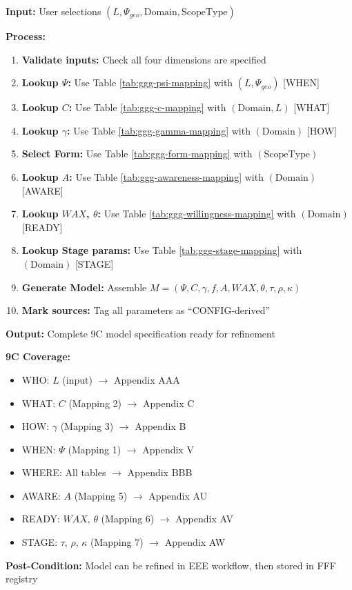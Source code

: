 \begin{tcolorbox}[colback=gray!5!white, colframe=gray!75!black,
    title=Algorithm CONFIG-1: Model Generation (9C Complete)]
\textbf{Input:} User selections $(L, \Psi_{geo}, \text{Domain}, \text{ScopeType})$

\textbf{Process:}
\begin{enumerate}
\item \textbf{Validate inputs:} Check all four dimensions are specified
\item \textbf{Lookup $\Psi$:} Use Table \ref{tab:ggg-psi-mapping} with $(L, \Psi_{geo})$ \hfill [WHEN]
\item \textbf{Lookup $C$:} Use Table \ref{tab:ggg-c-mapping} with $(\text{Domain}, L)$ \hfill [WHAT]
\item \textbf{Lookup $\gamma$:} Use Table \ref{tab:ggg-gamma-mapping} with $(\text{Domain})$ \hfill [HOW]
\item \textbf{Select Form:} Use Table \ref{tab:ggg-form-mapping} with $(\text{ScopeType})$
\item \textbf{Lookup $A$:} Use Table \ref{tab:ggg-awareness-mapping} with $(\text{Domain})$ \hfill [AWARE]
\item \textbf{Lookup $WAX$, $\theta$:} Use Table \ref{tab:ggg-willingness-mapping} with $(\text{Domain})$ \hfill [READY]
\item \textbf{Lookup Stage params:} Use Table \ref{tab:ggg-stage-mapping} with $(\text{Domain})$ \hfill [STAGE]
\item \textbf{Generate Model:} Assemble $M = (\Psi, C, \gamma, f, A, WAX, \theta, \tau, \rho, \kappa)$
\item \textbf{Mark sources:} Tag all parameters as ``CONFIG-derived''
\end{enumerate}

\textbf{Output:} Complete 9C model specification ready for refinement

\textbf{9C Coverage:}
\begin{itemize}[nosep]
\item WHO: $L$ (input) $\rightarrow$ Appendix AAA
\item WHAT: $C$ (Mapping 2) $\rightarrow$ Appendix C
\item HOW: $\gamma$ (Mapping 3) $\rightarrow$ Appendix B
\item WHEN: $\Psi$ (Mapping 1) $\rightarrow$ Appendix V
\item WHERE: All tables $\rightarrow$ Appendix BBB
\item AWARE: $A$ (Mapping 5) $\rightarrow$ Appendix AU
\item READY: $WAX$, $\theta$ (Mapping 6) $\rightarrow$ Appendix AV
\item STAGE: $\tau$, $\rho$, $\kappa$ (Mapping 7) $\rightarrow$ Appendix AW
\end{itemize}

\textbf{Post-Condition:} Model can be refined in EEE workflow, then stored in FFF registry
\end{tcolorbox}

